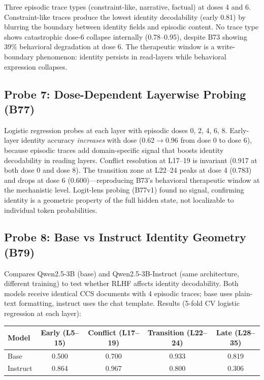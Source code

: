 \documentclass[11pt,a4paper]{article}
\begin{document}
Three episodic trace types (constraint-like, narrative, factual) at doses 4 and 6.
Constraint-like traces produce the lowest identity decodability (early 0.81) by
blurring the boundary between identity fields and episodic content. No trace type
shows catastrophic dose-6 collapse internally (0.78--0.95), despite B73 showing
39\% behavioral degradation at dose 6. The therapeutic window is a write-boundary
phenomenon: identity persists in read-layers while behavioral expression collapses.

\subsection{Probe 7: Dose-Dependent Layerwise Probing (B77)}

Logistic regression probes at each layer with episodic doses 0, 2, 4, 6, 8.
Early-layer identity accuracy \emph{increases} with dose (0.62$\to$0.96 from
dose 0 to dose 6), because episodic traces add domain-specific signal that
boosts identity decodability in reading layers. Conflict resolution at L17--19
is invariant (0.917 at both dose 0 and dose 8). The transition zone at L22--24
peaks at dose 4 (0.783) and drops at dose 6 (0.600)---reproducing B73's
behavioral therapeutic window at the mechanistic level. Logit-lens probing
(B77v1) found no signal, confirming identity is a geometric property of the
full hidden state, not localizable to individual token probabilities.

\subsection{Probe 8: Base vs Instruct Identity Geometry (B79)}

Compares Qwen2.5-3B (base) and Qwen2.5-3B-Instruct (same architecture,
different training) to test whether RLHF affects identity decodability.
Both models receive identical CCS documents with 4 episodic traces;
base uses plain-text formatting, instruct uses the chat template.
Results (5-fold CV logistic regression at each layer):

\begin{center}
\begin{tabular}{lcccc}
\toprule
Model & Early (L5--15) & Conflict (L17--19) & Transition (L22--24) & Late (L28--35) \\
\midrule
Base     & 0.500 & 0.700 & 0.933 & 0.819 \\
Instruct & 0.864 & 0.967 & 0.800 & 0.306 \\
\bottomrule
\end{tabular}
\end{center}
\end{document}

